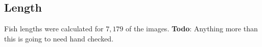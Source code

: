 \documentclass[screen,review]{acmart}
\begin{document}
\subsection{Length}
Fish lengths were calculated for \(7,179\) of the images. \textbf{Todo}: Anything more than this is going to need hand checked.

\end{document}
